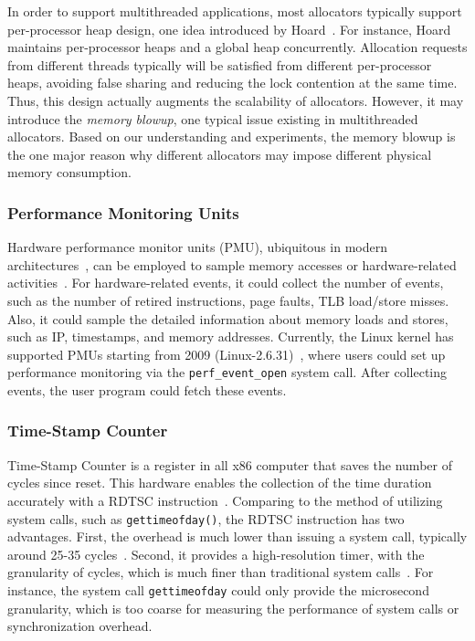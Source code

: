 In order to support multithreaded applications, most allocators typically support per-processor heap design, one idea introduced by Hoard~\cite{Hoard}. For instance, Hoard maintains per-processor heaps and a global heap concurrently. Allocation requests from different threads typically will be satisfied from different per-processor heaps, avoiding false sharing and reducing the lock contention at the same time. Thus, this design actually augments the scalability of allocators. However, it may introduce the \textit{memory blowup}, one typical issue existing in multithreaded allocators. Based on our understanding and experiments, the memory blowup is the one major reason why different allocators may impose different physical memory consumption. 

\subsubsection{Performance Monitoring Units}
\label{sec:pmu}

Hardware performance monitor units (PMU), ubiquitous in modern architectures~\cite{AMDIBS:07, IntelArch:PEBS:Sept09, armpmu}, can be employed to sample memory accesses or hardware-related activities~\cite{DBLP:conf/sc/ItzkowitzWAK03, ibs-sc, ibs-pact, Sheng:2011:RLN:1985793.1985848, LASER, Cheetah}. For hardware-related events, it could collect the number of events, such as the number of retired instructions, page faults, TLB load/store misses. Also, it could sample the detailed information about memory loads and stores, such as IP, timestamps, and memory addresses. Currently, the Linux kernel has supported PMUs starting from 2009 (Linux-2.6.31)~\cite{pmulinuxsupport}, where users could set up performance monitoring via  the \texttt{perf\_event\_open} system call. After collecting events, the user program could fetch these events. 

\subsubsection{Time-Stamp Counter}

\label{sec:rdtsc}

Time-Stamp Counter is a register in all x86 computer that saves the number of cycles since reset. This hardware enables the collection of the time duration accurately with a RDTSC instruction~\cite{coorporation1997using, weaver2013linux}. Comparing to the method of utilizing system calls, such as \texttt{gettimeofday()}, the RDTSC instruction has two advantages. First, the overhead is much lower than issuing a system call, typically around 25-35 cycles~\cite{rdtscoverhead}. Second, it provides a high-resolution timer, with the granularity of cycles, which is much finer than traditional system calls~\cite{pitfallsrdtsc}. For instance, the system call \texttt{gettimeofday} could only provide the microsecond granularity, which is too coarse for measuring the performance of system calls or synchronization overhead.    

